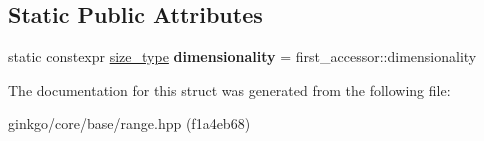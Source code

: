 \subsection*{Static Public Attributes}
\begin{DoxyCompactItemize}
\item 
\mbox{\label{structgko_1_1accessor_1_1mmul__operation_ae8057c37357eae7ea962f11aab54a38e}} 
static constexpr \hyperlink{namespacegko_a6e5c95df0ae4e47aab2f604a22d98ee7}{size\+\_\+type} {\bfseries dimensionality} = first\+\_\+accessor\+::dimensionality
\end{DoxyCompactItemize}


The documentation for this struct was generated from the following file\+:\begin{DoxyCompactItemize}
\item 
ginkgo/core/base/range.\+hpp (f1a4eb68)\end{DoxyCompactItemize}

